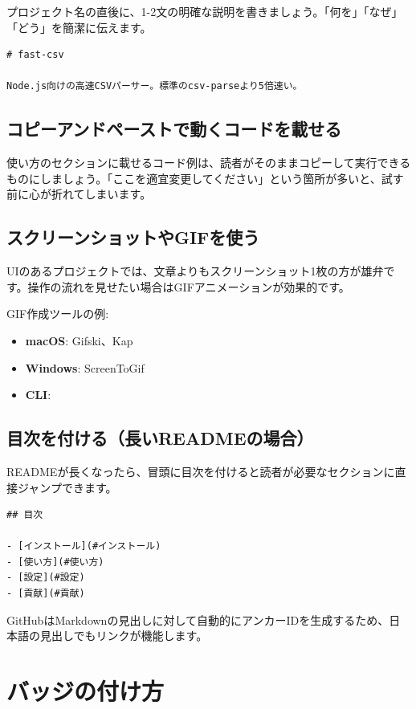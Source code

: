 プロジェクト名の直後に、1-2文の明確な説明を書きましょう。「何を」「なぜ」「どう」を簡潔に伝えます。

\begin{lstlisting}[language={}]
# fast-csv

Node.js向けの高速CSVパーサー。標準のcsv-parseより5倍速い。
\end{lstlisting}

\subsection{コピーアンドペーストで動くコードを載せる}

使い方のセクションに載せるコード例は、読者がそのままコピーして実行できるものにしましょう。「ここを適宜変更してください」という箇所が多いと、試す前に心が折れてしまいます。

\subsection{スクリーンショットやGIFを使う}

UIのあるプロジェクトでは、文章よりもスクリーンショット1枚の方が雄弁です。操作の流れを見せたい場合はGIFアニメーションが効果的です。

GIF作成ツールの例:
\begin{itemize}
  \item \textbf{macOS}: Gifski、Kap
  \item \textbf{Windows}: ScreenToGif
  \item \textbf{CLI}: 
\end{itemize}

\subsection{目次を付ける（長いREADMEの場合）}

READMEが長くなったら、冒頭に目次を付けると読者が必要なセクションに直接ジャンプできます。

\begin{lstlisting}[language={}]
## 目次

- [インストール](#インストール)
- [使い方](#使い方)
- [設定](#設定)
- [貢献](#貢献)
\end{lstlisting}

GitHubはMarkdownの見出しに対して自動的にアンカーIDを生成するため、日本語の見出しでもリンクが機能します。

\section{バッジの付け方}

